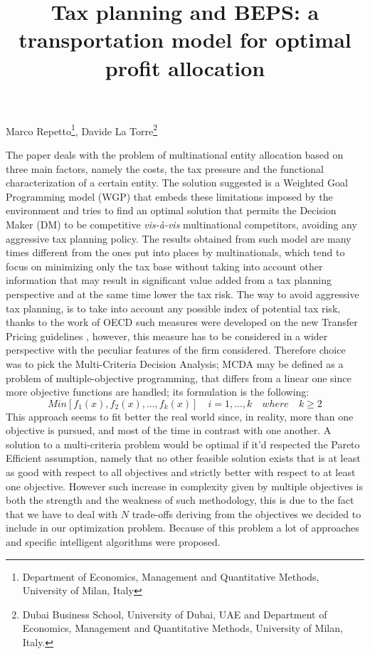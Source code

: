 \documentclass{article}
\begin{document}
\title{Tax planning and BEPS: a transportation model for optimal profit allocation}

\maketitle

\begin{center}
Marco Repetto\footnote{Department of Economics, Management and Quantitative Methods, University of Milan, Italy},
Davide La Torre\footnote{Dubai Business School, University of Dubai, UAE and Department of Economics, Management and Quantitative Methods, University of Milan, Italy.}
\end{center}

The paper deals with the problem of multinational entity allocation based on three main factors, namely the costs, the tax pressure and the functional characterization of a certain entity. The solution suggested is a Weighted Goal Programming model (WGP) that embeds these limitations imposed by the environment and tries to find an optimal solution that permits the Decision Maker (DM) to be competitive \textit{vis-à-vis} multinational competitors, avoiding any aggressive tax planning policy\cite{feller_three_2017}. The results obtained from such model are many times different from the ones put into places by multinationals, which tend to focus on minimizing only the tax base without taking into account other information that may result in significant value added from a tax planning perspective and at the same time lower the tax risk.
The way to avoid aggressive tax planning, is to take into account any possible index of potential tax risk, thanks to the work of OECD such measures were developed on the new Transfer Pricing guidelines \cite{TPguide2017}, however, this measure has to be considered in a wider perspective with the peculiar features of the firm considered.
Therefore choice was to pick the Multi-Criteria Decision Analysis; MCDA may be defined as a problem of multiple-objective programming, that differs from a linear one since more objective functions are handled; its formulation is the following:
	$$
	Min[f_1(x),f_2(x),...,f_k(x)] \quad i=1,...,k \quad where \quad k\geq2
	$$
	This approach seems to fit better the real world since, in reality, more than one objective is pursued, and most of the time in contrast with one another\cite{greco_multiple_2016}.
A solution to a multi-criteria problem would be optimal if it'd respected the Pareto Efficient assumption, namely that no other feasible solution exists that is at least as good with respect to all objectives and strictly better with respect to at least one objective. However such increase in complexity given by multiple objectives is both the strength and the weakness of such methodology, this is due to the fact that we have to deal with $N$ trade-offs deriving from the objectives we decided to include in our optimization problem. Because of this problem a lot of approaches and specific intelligent algorithms were proposed\cite{Cui2017}.
\end{document}
